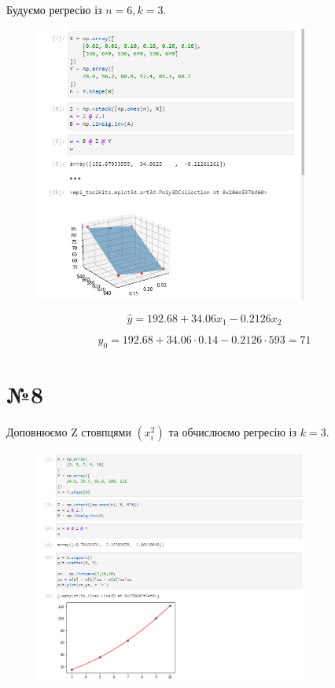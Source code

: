 \documentclass[11pt, a4paper]{article} %
\begin{document}
Будуємо регресію із $n=6, k=3$.

\begin{figure}[h]
    \centering
    \includegraphics[width=0.8\textwidth]{task7.png}
\end{figure}

$$\hat y = 192.68 + 34.06 x_1 - 0.2126 x_2$$

$$\hat y_0 = 192.68 + 34.06 \cdot 0.14 - 0.2126 \cdot 593 = 71$$

\pagebreak

\section*{№8}
Доповнюємо Z стовпцями $(x_i^2)$ та обчислюємо регресію із $k=3$.

\begin{figure}[h]
    \centering
    \includegraphics[width=0.8\textwidth]{task8.png}
\end{figure}
\end{document}
